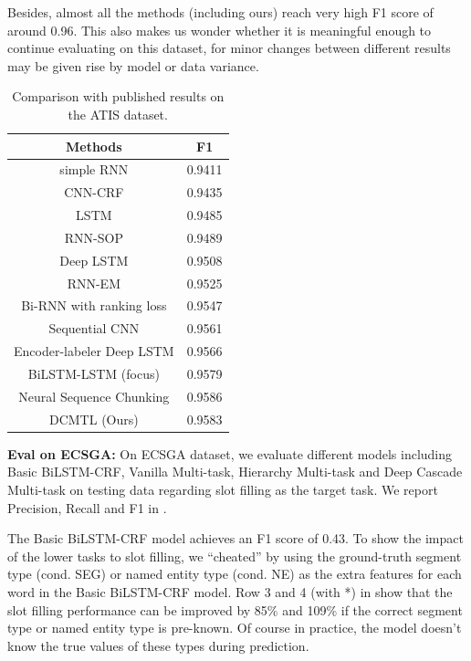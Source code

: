 Besides, almost all the methods (including ours) 
reach very high F1 score of around 0.96.
This also makes us wonder
whether it is meaningful enough to continue evaluating on this dataset,
for minor changes between different results may be given rise by model or data variance.
\begin{table}[th]
	\centering
	\scriptsize
	\begin{tabular}{c|c}
		\toprule
		Methods & F1 \\
		\midrule
		simple RNN \cite{yao2013recurrent} & 0.9411 \\
		CNN-CRF \cite{xu2013convolutional} & 0.9435 \\
		LSTM \cite{yao2014spoken} & 0.9485 \\
		RNN-SOP \cite{liu2015recurrent} & 0.9489 \\
		Deep LSTM \cite{yao2014spoken} & 0.9508 \\
		RNN-EM \cite{peng2015recurrent} & 0.9525 \\
		Bi-RNN with ranking loss \cite{vu2016bi} & 0.9547 \\
		Sequential CNN  \cite{vu2016sequential} & 0.9561 \\
		\midrule
		Encoder-labeler Deep LSTM \cite{kurata2016leveraging} & 0.9566 \\
		BiLSTM-LSTM (focus) \cite{zhu2017encoder} & 0.9579 \\
		Neural Sequence Chunking \cite{zhai2017neural} & 0.9586 \\
		\midrule
		DCMTL (Ours) & 0.9583  \\
		\bottomrule
	\end{tabular}
	\caption{Comparison with published results on the ATIS dataset.}
	\label{tab:eval_ATIS}
	\vspace{-10pt}
\end{table}

\noindent
\textbf{Eval on ECSGA:}
On ECSGA dataset,
we evaluate different models including 
Basic BiLSTM-CRF, Vanilla Multi-task, 
Hierarchy Multi-task and Deep Cascade Multi-task
on testing data regarding slot filling as the target task. %
We report Precision, Recall and F1 in .

The Basic BiLSTM-CRF model achieves an F1 score of 0.43.
To show the impact of the lower tasks to slot filling,
we ``cheated'' by using the ground-truth segment type (cond. SEG) or 
named entity type (cond. NE) as the extra features for each word
in the Basic BiLSTM-CRF model.
Row 3 and 4 (with *) in  show that the slot filling 
performance can be improved by 85\% and 109\% if the correct segment type
or named entity type is pre-known.
Of course in practice, the model doesn't know the true values of these types during prediction.

